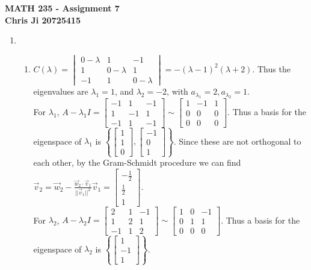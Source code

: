 \documentclass[10pt,english]{article}
\begin{document}
\noindent \begin{center}
\textbf{\large{}MATH 235 - Assignment 7}\\
\textbf{\large{}Chris Ji 20725415}
\par\end{center}{\large \par}
\medskip{}

\begin{enumerate}
\item \begin{enumerate}
    \item $C(\lambda)=\begin{vmatrix}0-\lambda&1&-1\\1&0-\lambda&1\\-1&1&0-\lambda\end{vmatrix}=-(\lambda-1)^2(\lambda+2)$. Thus the eigenvalues are $\lambda_1=1$, and $\lambda_2=-2$, with $a_{\lambda_1}=2,a_{\lambda_2}=1$. \\ 
    For $\lambda_1$, $A-\lambda_1I=\begin{bmatrix}-1&1&-1\\1&-1&1\\-1&1&-1\end{bmatrix}\sim\begin{bmatrix}1&-1&1\\0&0&0\\0&0&0\end{bmatrix}$. Thus a basis for the eigenspace of $\lambda_1$ is $\left\{\begin{bmatrix}1\\1\\0\end{bmatrix},\begin{bmatrix}-1\\0\\1\end{bmatrix}\right\}$. Since these are not orthogonal to each other, by the Gram-Schmidt procedure we can find $\vec{v}_2=\vec{w}_2-\frac{\vec{w}_2\cdot\vec{v}_1}{||\vec{v}_1||^2}\vec{v}_1=\begin{bmatrix}-\frac{1}{2}\\\frac{1}{2}\\1\end{bmatrix}$. \\ 
    For $\lambda_2$, $A-\lambda_2I=\begin{bmatrix}2&1&-1\\1&2&1\\-1&1&2\end{bmatrix}\sim\begin{bmatrix}1&0&-1\\0&1&1\\0&0&0\end{bmatrix}$. Thus a basis for the eigenspace of $\lambda_2$ is $\left\{\begin{bmatrix}1\\-1\\1\end{bmatrix}\right\}$. \\ 

\end{enumerate}
\end{enumerate}
\end{document}
